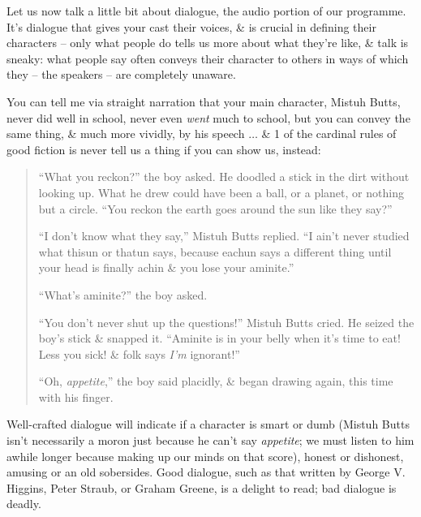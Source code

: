 \documentclass{article}
\numberwithin{equation}{section}
\begin{document}
 Let us now talk a little bit about dialogue, the audio portion of our programme. It's dialogue that gives your cast their voices, \& is crucial in defining their characters -- only what people do tells us more about what they're like, \& talk is sneaky: what people say often conveys their character to others in ways of which they -- the speakers -- are completely unaware.

You can tell me via straight narration that your main character, Mistuh Butts, never did well in school, never even \textit{went} much to school, but you can convey the same thing, \& much more vividly, by his speech $\ldots$ \& 1 of the cardinal rules of good fiction is never tell us a thing if you can show us, instead:
\begin{quotation}
	``What you reckon?'' the boy asked. He doodled a stick in the dirt without looking up. What he drew could have been a ball, or a planet, or nothing but a circle. ``You reckon the earth goes around the sun like they say?''
	
	``I don't know what they say,'' Mistuh Butts replied. ``I ain't never studied what thisun or thatun says, because eachun says a different thing until your head is finally achin \& you lose your aminite.''
	
	``What's aminite?'' the boy asked.
	
	``You don't never shut up the questions!'' Mistuh Butts cried. He seized the boy's stick \& snapped it. ``Aminite is in your belly when it's time to eat! Less you sick! \& folk says \textit{I'm} ignorant!''
	
	``Oh, \textit{appetite},'' the boy said placidly, \& began drawing again, this time with his finger.
\end{quotation}
Well-crafted dialogue will indicate if a character is smart or dumb (Mistuh Butts isn't necessarily a moron just because he can't say \textit{appetite}; we must listen to him awhile longer because making up our minds on that score), honest or dishonest, amusing or an old sobersides. Good dialogue, such as that written by George V. Higgins, Peter Straub, or Graham Greene, is a delight to read; bad dialogue is deadly.
\end{document}

